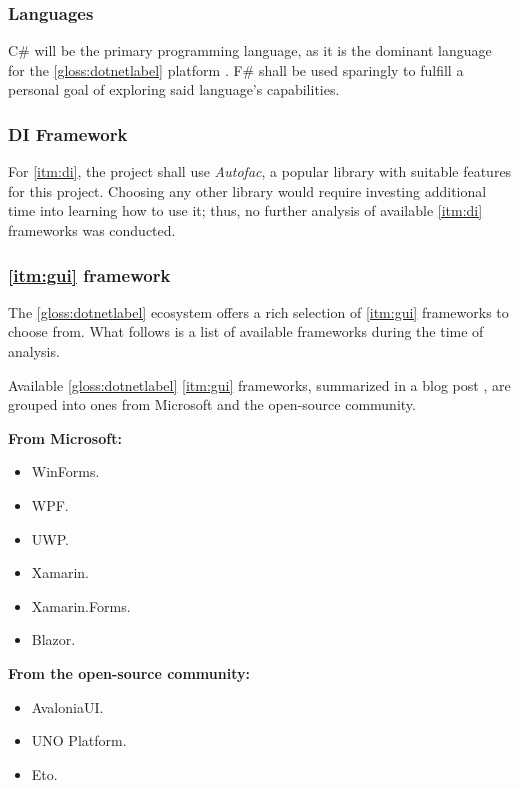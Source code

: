 \subsubsection{Languages}

C\# will be the primary programming language, as it is the dominant language for the \ref{gloss:dotnetlabel} platform \cite{noauthor_tiobe_2022}.
F\# shall be used sparingly to fulfill a personal goal of exploring said language's capabilities.

\subsubsection{DI Framework}

For \ref{itm:di}, the project shall use \textit{Autofac}, a popular library with suitable features for this project. Choosing any other library would require investing additional time into learning how to use it; thus, no further analysis of available \ref{itm:di} frameworks was conducted.

\subsubsection{\ref{itm:gui} framework} \label{sec:guiFramework}

The \ref{gloss:dotnetlabel} ecosystem offers a rich selection of \ref{itm:gui} frameworks to choose from. What follows is a list of available frameworks during the time of analysis.

Available \ref{gloss:dotnetlabel} \ref{itm:gui} frameworks, summarized in a blog post \cite{stilgar_state_2018}, are grouped into ones from Microsoft and the open-source community.

\textbf{From Microsoft:}
\begin{itemize}
    \item WinForms.
    \item WPF.
    \item UWP.
    \item Xamarin.
    \item Xamarin.Forms.
    \item Blazor.
\end{itemize}

\textbf{From the open-source community:}
\begin{itemize}
    \item AvaloniaUI.
    \item UNO Platform.
    \item Eto.
\end{itemize}

